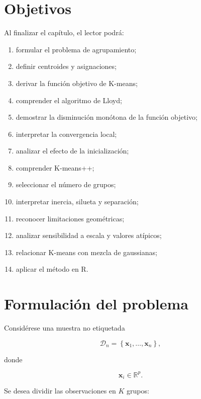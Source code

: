 \documentclass[
  spanish,
  10.5pt,
  letterpaper,
  DIV=11,
  numbers=noendperiod,
  oneside,
  open=any]{scrreprt}
\providecommand{\tightlist}{%
  \setlength{\itemsep}{0pt}\setlength{\parskip}{0pt}}
\theoremstyle{definition}
\theoremstyle{definition}
\theoremstyle{plain}
\theoremstyle{remark}
\begin{document}
\section*{Objetivos}\label{objetivos-17}


Al finalizar el capítulo, el lector podrá:

\begin{enumerate}
\def\labelenumi{\arabic{enumi}.}
\tightlist
\item
  formular el problema de agrupamiento;
\item
  definir centroides y asignaciones;
\item
  derivar la función objetivo de K-means;
\item
  comprender el algoritmo de Lloyd;
\item
  demostrar la disminución monótona de la función objetivo;
\item
  interpretar la convergencia local;
\item
  analizar el efecto de la inicialización;
\item
  comprender K-means++;
\item
  seleccionar el número de grupos;
\item
  interpretar inercia, silueta y separación;
\item
  reconocer limitaciones geométricas;
\item
  analizar sensibilidad a escala y valores atípicos;
\item
  relacionar K-means con mezcla de gaussianas;
\item
  aplicar el método en R.
\end{enumerate}

\section*{Formulación del problema}\label{formulaciuxf3n-del-problema}


Considérese una muestra no etiquetada

\[
\mathcal{D}_n
=
\left\{
\mathbf{x}_1,\ldots,\mathbf{x}_n
\right\},
\]

donde

\[
\mathbf{x}_i\in\mathbb{R}^{p}.
\]

Se desea dividir las observaciones en \(K\) grupos:
\end{document}
